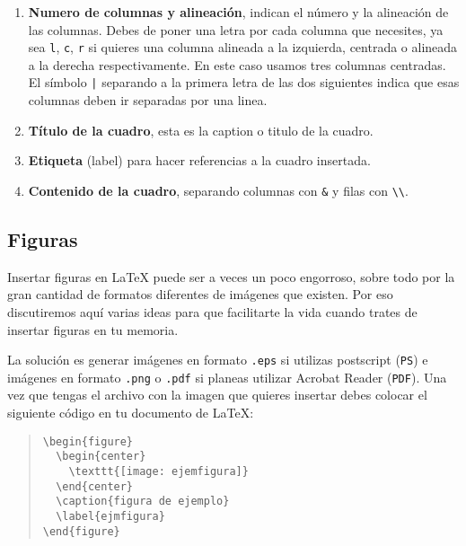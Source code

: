 \begin{enumerate}
	\item \textbf{Numero de columnas y alineaci\'on}, indican el n\'umero y la alineaci\'on de las columnas. Debes de poner 
				una letra por cada columna que necesites, ya sea \verb|l|, \verb|c|, \verb|r| si quieres una columna alineada a la
				izquierda, centrada o alineada a la derecha respectivamente. En este caso usamos tres columnas centradas. El 
				s\'imbolo \verb#|# separando a la primera letra de las dos siguientes indica que esas columnas deben ir separadas 
				por una linea. 
	\item \textbf{T\'itulo de la cuadro}, esta es la caption o titulo de la cuadro. 
	\item \textbf{Etiqueta} (label) para hacer referencias a la cuadro insertada.
	\item \textbf{Contenido de la cuadro}, separando columnas con \verb+&+ y filas con \verb+\\+.  
\end{enumerate}
 


\subsection{Figuras}

Insertar figuras en \LaTeX{} puede ser a veces un poco engorroso, sobre todo por
la gran cantidad de formatos diferentes de im\'agenes que existen. Por eso discutiremos
aqu\'i varias ideas para que facilitarte la vida cuando trates de insertar figuras en tu
memoria.

La  soluci\'on es generar im\'agenes en formato
\texttt{.eps} si utilizas postscript (\texttt{PS}) e im\'agenes en formato \texttt{.png} o
\texttt{.pdf} si planeas utilizar Acrobat Reader (\texttt{PDF}). Una vez que tengas el
archivo con la imagen que quieres insertar debes colocar el siguiente c\'odigo en
tu documento de \LaTeX{}:

\begin{quote}
\begin{verbatim}
\begin{figure}
  \begin{center}
    \texttt{[image: ejemfigura]}
  \end{center}
  \caption{figura de ejemplo}
  \label{ejmfigura}
\end{figure}
\end{verbatim}
\end{quote}

